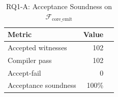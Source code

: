 \begin{table}[t]
\centering
\caption{RQ1-A: Acceptance Soundness on $\mathcal{F}_{\text{core\_emit}}$}
\label{tab:rq1_soundness}
\begin{tabular}{lrr}
\toprule
Metric & Value \\
\midrule
Accepted witnesses & 102 \\
Compiler pass & 102 \\
Accept-fail & 0 \\
Acceptance soundness & 100\% \\
\bottomrule
\end{tabular}
\end{table}
